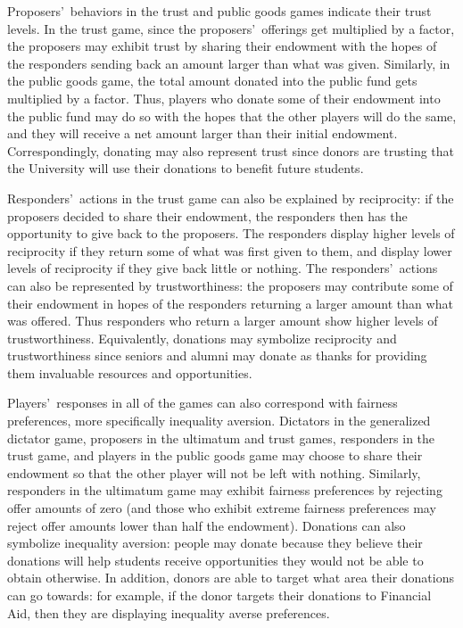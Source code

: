 \documentclass[12pt]{article}
\begin{document}
Proposers\rq \ behaviors in the trust and public goods games indicate their trust levels. In the trust game, since the proposers\rq \ offerings get multiplied by a factor, the proposers may exhibit trust by sharing their endowment with the hopes of the responders sending back an amount larger than what was given. Similarly, in the public goods game, the total amount donated into the public fund gets multiplied by a factor. Thus, players who donate some of their endowment into the public fund may do so with the hopes that the other players will do the same, and they will receive a net amount larger than their initial endowment. Correspondingly, donating may also represent trust since donors are trusting that the University will use their donations to benefit future students.

Responders\rq \ actions in the trust game can also be explained by reciprocity: if the proposers decided to share their endowment, the responders then has the opportunity to give back to the proposers. The responders display higher levels of reciprocity if they return some of what was first given to them, and display lower levels of reciprocity if they give back little or nothing. The responders\rq \ actions can also be represented by trustworthiness: the proposers may contribute some of their endowment in hopes of the responders returning a larger amount than what was offered. Thus responders who return a larger amount show higher levels of trustworthiness. Equivalently, donations may symbolize reciprocity and trustworthiness since seniors and alumni may donate as thanks for providing them invaluable resources and opportunities.

Players\rq \ responses in all of the games can also correspond with fairness preferences, more specifically inequality aversion. Dictators in the generalized dictator game, proposers in the ultimatum and trust games, responders in the trust game, and players in the public goods game may choose to share their endowment so that the other player will not be left with nothing. Similarly, responders in the ultimatum game may exhibit fairness preferences by rejecting offer amounts of zero (and those who exhibit extreme fairness preferences may reject offer amounts lower than half the endowment). Donations can also symbolize inequality aversion: people may donate because they believe their donations will help students receive opportunities they would not be able to obtain otherwise. In addition, donors are able to target what area their donations can go towards: for example, if the donor targets their donations to Financial Aid, then they are displaying inequality averse preferences.
\end{document}

